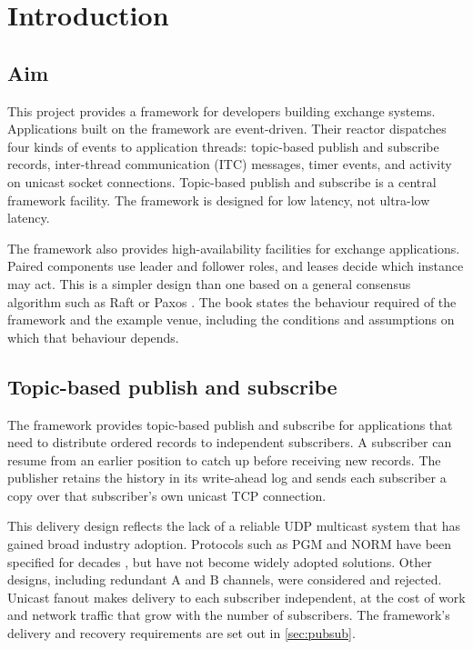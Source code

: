 \chapter{Introduction}
\label{ch:introduction}

\section{Aim}
\label{sec:introduction:aim}

This project provides a framework for developers building exchange systems.
Applications built on the framework are event-driven. Their reactor dispatches
four kinds of events to application threads: topic-based publish and subscribe
records, inter-thread communication (ITC) messages, timer events, and activity
on unicast socket connections. Topic-based publish and subscribe is a central
framework facility. The framework is designed for low latency, not
ultra-low latency.

The framework also provides high-availability facilities for exchange
applications. Paired components use leader and follower roles, and leases
decide which instance may act. This is a simpler design than one based on a
general consensus algorithm such as Raft or Paxos
\cite{ongaro2014raft,lamport2001paxos}. The book states the
behaviour required of the framework and the example venue, including the
conditions and assumptions on which that behaviour depends.

\section{Topic-based publish and subscribe}
\label{sec:introduction:pubsub}

The framework provides topic-based publish and subscribe for applications
that need to distribute ordered records to independent subscribers. A
subscriber can resume from an earlier position to catch up before receiving
new records. The publisher retains the history in its write-ahead log and
sends each subscriber a copy over that subscriber's own unicast TCP
connection.

This delivery design reflects the lack of a reliable UDP multicast system
that has gained broad industry adoption. Protocols such as PGM and NORM have
been specified for decades \cite{rfc3208,rfc5740}, but have not become widely
adopted solutions. Other designs, including redundant A and B channels, were
considered and rejected. Unicast fanout makes delivery to each subscriber
independent, at the cost of work and network traffic that grow with the number
of subscribers. The framework's delivery and recovery requirements are set
out in \cref{sec:pubsub}.

